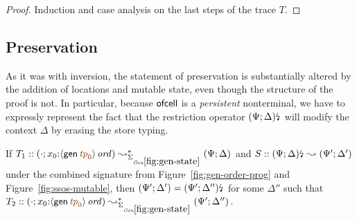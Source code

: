 \begin{proof}
Induction and case analysis on the last steps of the trace $T$. 
\end{proof}





\subsection{Preservation}

As it was with inversion, the statement of preservation is
substantially altered by the addition of locations and mutable state,
even though the structure of the proof is not.  In particular, because
${\sf ofcell}$ is a {\it persistent} nonterminal, we have to expressly
represent the fact that the restriction operator ${(\Psi;
  \Delta)}{\mbox{\lightning}}_{}$ will modify the context $\Delta$ by erasing the store
typing.

\bigskip
\begin{theorem}
\label{thm:siggenstate}
If $T_1 :: (\cdot; x_0{:}\istrue{\susp{{\sf gen}\,\lf{{\it tp}_0}}}) 
   \leadsto^*_{\siggenstate} 
   (\Psi; \Delta)$ and 
   $S :: {(\Psi; \Delta)}{\mbox{\lightning}}_{} \leadsto (\Psi'; \Delta')$
under the combined signature from Figure~\ref{fig:gen-order-prog}
and Figure~\ref{fig:ssos-mutable}, then
$(\Psi'; \Delta') = {(\Psi'; \Delta'')}{\mbox{\lightning}}_{}$ 
for some $\Delta''$ such that 
$T_2 :: (\cdot; x_0{:}\istrue{\susp{{\sf gen}\,\lf{{\it tp}_0}}}) 
   \leadsto^*_{\siggenstate} 
   (\Psi'; \Delta'')$.
\end{theorem}


